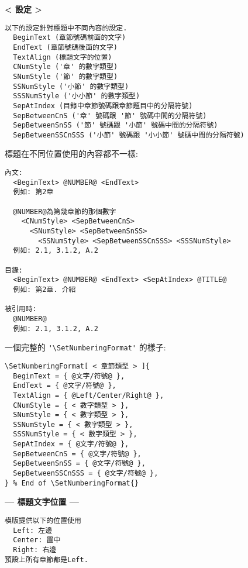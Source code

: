 \begin{enumerate}
{  \newpage
    \textbf{< 設定 >}
    \begin{DescriptionFrame}
    \begin{verbatim}
以下的設定針對標題中不同內容的設定.
  BeginText (章節號碼前面的文字)
  EndText (章節號碼後面的文字)
  TextAlign (標題文字的位置)
  CNumStyle ('章' 的數字類型)
  SNumStyle ('節' 的數字類型)
  SSNumStyle ('小節' 的數字類型)
  SSSNumStyle ('小小節' 的數字類型)
  SepAtIndex (目錄中章節號碼跟章節題目中的分隔符號)
  SepBetweenCnS ('章' 號碼跟 '節' 號碼中間的分隔符號)
  SepBetweenSnSS ('節' 號碼跟 '小節' 號碼中間的分隔符號)
  SepBetweenSSCnSSS ('小節' 號碼跟 '小小節' 號碼中間的分隔符號)
    \end{verbatim}
    \end{DescriptionFrame}

    標題在不同位置使用的內容都不一樣:
    \begin{DescriptionFrame}
    \begin{verbatim}
內文:
  <BeginText> @NUMBER@ <EndText>
  例如: 第2章

  @NUMBER@為第幾章節的那個數字
    <CNumStyle> <SepBetweenCnS>
      <SNumStyle> <SepBetweenSnSS>
        <SSNumStyle> <SepBetweenSSCnSSS> <SSSNumStyle>
  例如: 2.1, 3.1.2, A.2

目錄:
  <BeginText> @NUMBER@ <EndText> <SepAtIndex> @TITLE@
  例如: 第2章. 介紹

被引用時:
  @NUMBER@
  例如: 2.1, 3.1.2, A.2
    \end{verbatim}
    \end{DescriptionFrame}

  \newpage
    一個完整的 \verb|'\SetNumberingFormat'| 的樣子:
    \begin{DescriptionFrame}
    \begin{verbatim}
\SetNumberingFormat[ < 章節類型 > ]{
  BeginText = { @文字/符號@ },
  EndText = { @文字/符號@ },
  TextAlign = { @Left/Center/Right@ },
  CNumStyle = { < 數字類型 > },
  SNumStyle = { < 數字類型 > },
  SSNumStyle = { < 數字類型 > },
  SSSNumStyle = { < 數字類型 > },
  SepAtIndex = { @文字/符號@ },
  SepBetweenCnS = { @文字/符號@ },
  SepBetweenSnSS = { @文字/符號@ },
  SepBetweenSSCnSSS = { @文字/符號@ },
} % End of \SetNumberingFormat{}
    \end{verbatim}
    \end{DescriptionFrame}

    \textbf{--- 標題文字位置 ---}
    \begin{DescriptionFrame}
    \begin{verbatim}
模版提供以下的位置使用
  Left: 左邊
  Center: 置中
  Right: 右邊
預設上所有章節都是Left.


\end{verbatim}
\end{DescriptionFrame}}
\end{enumerate}
